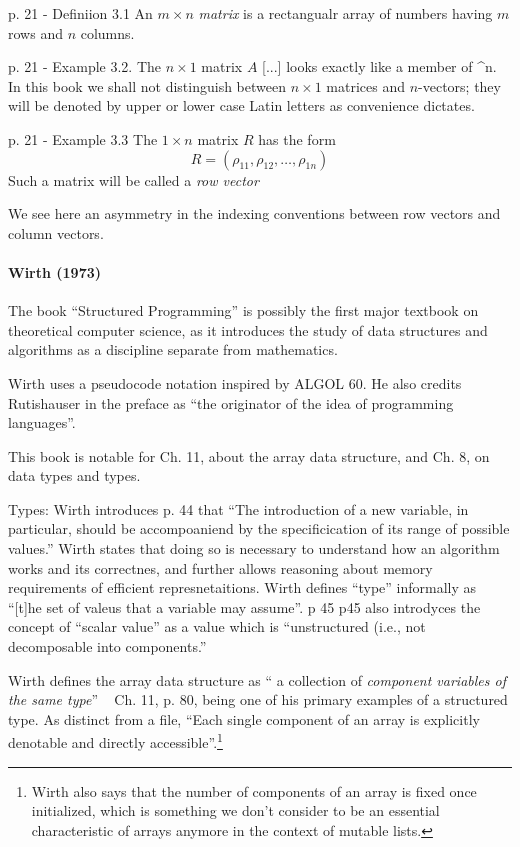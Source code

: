 p. 21 - Definiion 3.1 An $m\times n$ \textit{matrix} is a rectangualr array of numbers
having $m$ rows and $n$ columns.

p. 21 - Example 3.2. The $n\times1$ matrix $A$ [...] looks exactly like a member of \mathbbR^n. In this book
we shall not distinguish between $n\times1$ matrices and $n$-vectors; they will be denoted by
upper or lower case Latin letters as convenience dictates.

p. 21 - Example 3.3 The $1\times n$ matrix $R$ has the form
\[
    R = (\rho_{11},\rho_{12},\dots,\rho_{1n})
\]
Such a matrix will be called a \textit{row vector}

We see here an asymmetry in the indexing conventions between row vectors and
column vectors.

\paragraph{Wirth (1973)~\cite{Wirth1973}}

The book ``Structured Programming'' is possibly the first major textbook on theoretical computer science, as it introduces the study of data structures and algorithms as a discipline separate from mathematics.

Wirth uses a pseudocode notation inspired by ALGOL 60. He also credits Rutishauser
in the preface as ``the originator of the idea of programming languages''.

This book is notable for Ch. 11, about the array data structure, and Ch. 8, on data types and types.

Types: Wirth introduces p. 44 that ``The introduction of a new variable, in particular,
should be accompoaniend by the specificication of
its range of possible values.'' Wirth states that doing so is necessary to understand
how an algorithm works and its correctnes, and further allows reasoning about memory requirements
of efficient represnetaitions.
Wirth defines ``type'' informally as ``[t]he set of valeus that a variable may assume''. p 45
p45 also introdyces the concept of ``scalar value'' as a value which is ``unstructured (i.e., not decomposable into components.''


Wirth defines the array data structure as `` a collection of \textit{component variables of the same type}'' ~ Ch. 11, p. 80, being one of his primary examples of a structured type. As distinct from a file, ``Each single component of an array is explicitly denotable and directly accessible''.\footnote{Wirth also says that the number of
components of an array is fixed once initialized, which is something we don't
consider to be an essential characteristic of arrays anymore in the context of
mutable lists.}

